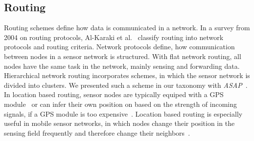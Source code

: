 
\subsection{Routing}
\label{sec:Routing}

Routing schemes define how data is communicated in a network. In a survey from
2004 on routing protocols, Al-Karaki et al.~\cite{al2004routing} classify
routing into network protocols and routing criteria. Network protocols define,
how communication between nodes in a sensor network is structured. With flat
network routing, all nodes have the same task in the network, mainly sensing
and forwarding data. Hierarchical network routing incorporates schemes, in
which the sensor network is divided into clusters. We presented such a scheme
in our taxonomy with \textit{ASAP}~\cite{gedik2007asap}. In location based
routing, sensor nodes are typically equiped with a GPS
module~\cite{xu2001geography} or can infer their own position on based on the
strength of incoming signals, if a GPS module is too
expensive~\cite{hu2004localization}. Location based routing is especially
useful in mobile sensor networks, in which nodes change their position in the
sensing field frequently and therefore change their
neighbors~\cite{hu2004localization}.

